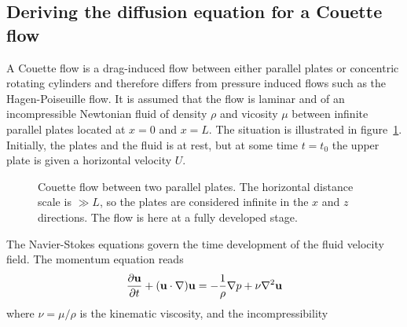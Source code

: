 \documentclass[aps,reprint]{revtex4-1}
\def\axislength{.5}
\begin{document}
\subsection{Deriving the diffusion equation for a Couette flow}
A Couette flow is a drag-induced flow between either parallel plates or concentric
rotating cylinders and therefore differs from pressure induced flows such as the
Hagen-Poiseuille flow. It is assumed that the flow is laminar and of an incompressible
Newtonian fluid of density $\rho$ and vicosity $\mu$ between infinite parallel
plates located at $x = 0$ and $x = L$. The situation is illustrated in figure~\ref{fig:couette}.
Initially, the plates and the fluid is at rest, but at some time $t = t_0$
the upper plate is given a horizontal velocity $U$.
\begin{figure}[H]
  \centering
  \caption{Couette flow between two parallel plates. The horizontal distance
  scale is $\gg L$, so the plates are considered infinite in the $x$ and $z$
  directions. The flow is here at a fully developed stage.}
  \label{fig:couette}
\end{figure}
The Navier-Stokes equations govern the time development of the fluid velocity field.
The momentum equation reads
\begin{align*}
  \pdv{\vb{u}}{t} + (\vb{u} \cdot \nabla) \vb{u} = - \frac{1}{\rho} \nabla p + \nu \nabla^2 \vb{u}
\end{align*}
where $\nu = \mu/\rho$ is the kinematic viscosity, and the incompressibility
\end{document}
